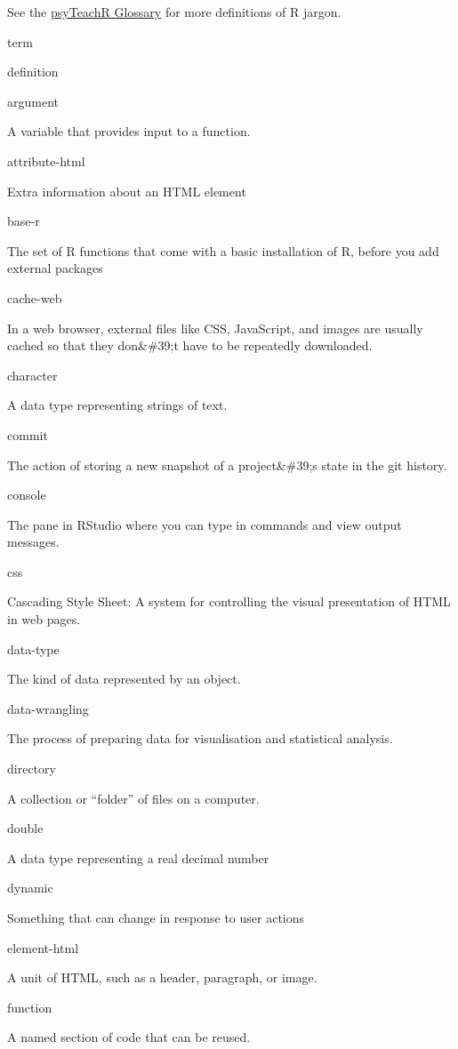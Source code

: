 \documentclass[
  oneside]{book}
\begin{document}
See the \href{https://psyteachr.github.io/glossary/}{psyTeachR Glossary} for more definitions of R jargon.

term

definition

argument

A variable that provides input to a function.

attribute-html

Extra information about an HTML element

base-r

The set of R functions that come with a basic installation of R, before you add external packages

cache-web

In a web browser, external files like CSS, JavaScript, and images are usually cached so that they don\&\#39;t have to be repeatedly downloaded.

character

A data type representing strings of text.

commit

The action of storing a new snapshot of a project\&\#39;s state in the git history.

console

The pane in RStudio where you can type in commands and view output messages.

css

Cascading Style Sheet: A system for controlling the visual presentation of HTML in web pages.

data-type

The kind of data represented by an object.

data-wrangling

The process of preparing data for visualisation and statistical analysis.

directory

A collection or ``folder'' of files on a computer.

double

A data type representing a real decimal number

dynamic

Something that can change in response to user actions

element-html

A unit of HTML, such as a header, paragraph, or image.

function

A named section of code that can be reused.
\end{document}
